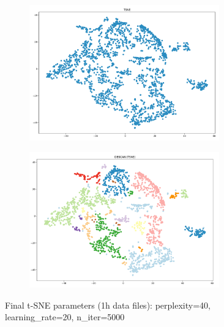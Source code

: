 \begin{figure}
  \centering
	\begin{subfigure}{.5\textwidth}
    \centering
    \includegraphics[width=0.9\textwidth]{./images/tsneParametersTest/1h-1-finalTSNE.png}
  \end{subfigure}%
  \begin{subfigure}{.5\textwidth}
    \centering
    \includegraphics[width=0.9\textwidth]{./images/tsneParametersTest/1h-1-finalTSNEDBSCAN.png}
	\end{subfigure}
	\caption{Final t-SNE parameters (1h data files): perplexity=40, learning\_rate=20, n\_iter=5000 }
  \label{figure:finalTSNE1h}
\end{figure}

